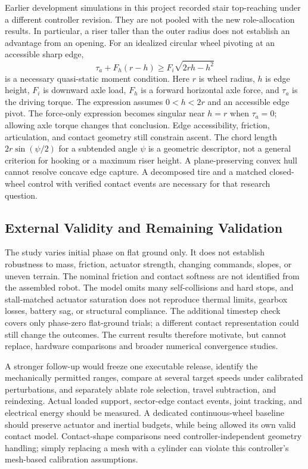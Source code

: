\documentclass[letterpaper,10pt,conference]{ieeeconf}
\begin{document}
Earlier development simulations in this project recorded stair top-reaching under a different controller revision. They are not pooled with the new role-allocation results. In particular, a riser taller than the outer radius does not establish an advantage from an opening. For an idealized circular wheel pivoting at an accessible sharp edge,
\begin{equation}
 \tau_a+F_h(r-h)\ge F_i\sqrt{2rh-h^2}
\end{equation}
is a necessary quasi-static moment condition. Here $r$ is wheel radius, $h$ is edge height, $F_i$ is downward axle load, $F_h$ is a forward horizontal axle force, and $\tau_a$ is the driving torque. The expression assumes $0<h<2r$ and an accessible edge pivot. The force-only expression becomes singular near $h=r$ when $\tau_a=0$; allowing axle torque changes that conclusion. Edge accessibility, friction, articulation, and contact geometry still constrain ascent. The chord length $2r\sin(\psi/2)$ for a subtended angle $\psi$ is a geometric descriptor, not a general criterion for hooking or a maximum riser height. A plane-preserving convex hull cannot resolve concave edge capture. A decomposed tire and a matched closed-wheel control with verified contact events are necessary for that research question.

\subsection{External Validity and Remaining Validation}
The study varies initial phase on flat ground only. It does not establish robustness to mass, friction, actuator strength, changing commands, slopes, or uneven terrain. The nominal friction and contact softness are not identified from the assembled robot. The model omits many self-collisions and hard stops, and stall-matched actuator saturation does not reproduce thermal limits, gearbox losses, battery sag, or structural compliance. The additional timestep check covers only phase-zero flat-ground trials; a different contact representation could still change the outcomes. The current results therefore motivate, but cannot replace, hardware comparisons and broader numerical convergence studies.

A stronger follow-up would freeze one executable release, identify the mechanically permitted ranges, compare at several target speeds under calibrated perturbations, and separately ablate role selection, travel subtraction, and reindexing. Actual loaded support, sector-edge contact events, joint tracking, and electrical energy should be measured. A dedicated continuous-wheel baseline should preserve actuator and inertial budgets, while being allowed its own valid contact model. Contact-shape comparisons need controller-independent geometry handling; simply replacing a mesh with a cylinder can violate this controller's mesh-based calibration assumptions.
\end{document}

